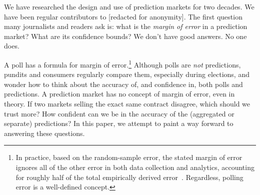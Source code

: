 \documentclass[sigconf,anonymous]{aamas}   %
\newcommand{\dreev} [1]{\ifnum\Chatty=1 \textcolor{purple}{dreev:  [#1]} \fi}
\begin{document}
We have researched the design and use of prediction markets for two decades. 
We have been regular contributors to [redacted for anonymity].
The first question many journalists and readers ask is: what is the \textit{margin of error} in a prediction market? What are its confidence bounds?
We don't have good answers. No one does.

A poll has a formula for margin of error.\footnote{In practice, based on the random-sample error, the stated margin of error ignores all of the other error in both data collection and analytics, accounting for roughly half of the total empirically derived error~\cite{shirani2018disentangling}. 
Regardless, polling error is a well-defined concept.}
Although polls are \textit{not} predictions, pundits and consumers regularly compare them, especially during elections, and wonder how to think about the accuracy of, and confidence in, both polls and predictions.
A prediction market has no concept of margin of error, even in theory.
If two markets selling the exact same contract disagree, which should we trust more?
How confident can we be in the accuracy of the (aggregated or separate) predictions?
In this paper, we attempt to paint a way forward to answering these questions.
\end{document}

